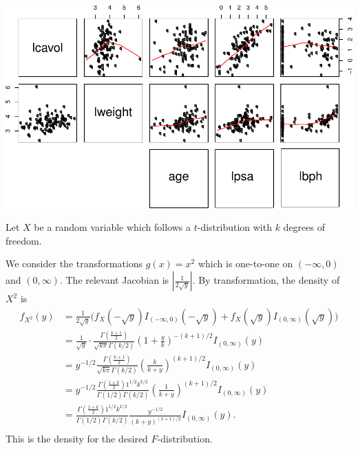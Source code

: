 \documentclass{homework}
\begin{document}
\begin{solution}
    \includegraphics[width=.8\textwidth]{prostate_pairs.pdf}

  \end{solution}
\newpage
\begin{longproblem}
  Let $X$ be a random variable which follows a $t$-distribution with $k$ degrees of freedom.  

  \begin{solution}
  We consider the transformations $g(x) = x^2$ which is one-to-one on $(-\infty,0)$ and $(0,\infty)$.  The relevant Jacobian is
  $|\frac 1{2\sqrt y}|.$ By transformation, the density of $X^2$ is
  \begin{align*}
    f_{X^2}(y) &= \frac 1{2 \sqrt y} \Big(f_X( -\sqrt y) I_{(-\infty,0)}(-\sqrt y) + f_X( \sqrt y ) I_{(0,\infty)}(\sqrt y)\Big)\\
    &= \frac1{\sqrt y}\cdot \frac{\Gamma\left(\frac{k+1}2\right)}{\sqrt{k\pi} \Gamma(k/2)}\left(1 + \frac{y}k\right)^{-(k+1)/2} I_{(0,\infty)}(y)\\
    &= y^{-1/2}\frac{\Gamma\left(\frac{k+1}2\right)}{\sqrt{k\pi} \Gamma(k/2)}\left(\frac k{k + y}\right)^{(k+1)/2} I_{(0,\infty)}(y)\\
    &= y^{-1/2}\frac{\Gamma\left(\frac{1+k}2\right)1^{1/2}k^{k/2}}{\Gamma(1/2) \Gamma(k/2)}\left(\frac {1}{k + y}\right)^{(k+1)/2} I_{(0,\infty)}(y)\\
    &= \frac{\Gamma\left(\frac{1+k}2\right)1^{1/2}k^{k/2}}{\Gamma(1/2) \Gamma(k/2)}\frac {y^{-1/2}}{(k + y)^{(k+1)/2}} I_{(0,\infty)}(y).\\
  \end{align*}
  This is the density for the desired $F$-distribution.
  \end{solution}
\end{longproblem}

\end{document}
